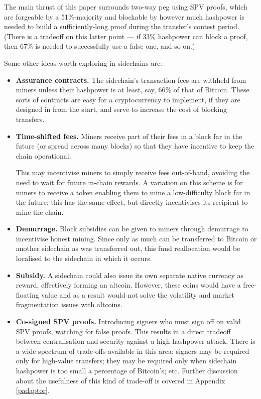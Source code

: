 \documentclass[letterpaper]{article}
\newcommand{\sidechain}{sidechain\xspace}
\newcommand{\sidechains}{sidechains\xspace}
\newcommand{\altcoin}{altcoin\xspace}
\newcommand{\altcoins}{altcoins\xspace}
\newcommand{\twowp}{two-way peg\xspace}
\begin{document}
The main thrust of this paper surrounds \twowp using SPV proofs, which are
forgeable by a 51\%-majority and blockable by however much hashpower is needed
to build a sufficiently-long proof during the transfer's contest period. (There is a tradeoff
on this latter point --- if 33\% hashpower can block a proof, then
67\% is needed to successfully use a false one, and so on.)

Some other ideas worth exploring in \sidechains are:
\begin{itemize}
\item \textbf{Assurance contracts.} The sidechain's transaction fees are withheld
from miners unless their hashpower is at least, say, 66\% of that of Bitcoin.
These sorts of contracts are easy for a cryptocurrency to implement, if they are
designed in from the start, and serve to increase the cost of blocking transfers.

\item \textbf{Time-shifted fees.} Miners receive part of their fees in a block
far in the future (or spread across many blocks) so that they have incentive to
keep the chain operational.

This may incentivise miners to simply receive fees out-of-band, avoiding the need
to wait for future in-chain rewards. A variation on this scheme is for miners to receive
a token enabling them to mine a low-difficulty block far in the future; this has the same
effect, but directly incentivises its recipient to mine the chain.

\item \textbf{Demurrage.} Block subsidies can be given to miners through
demurrage to incentivise honest mining. Since only as
much can be transferred to Bitcoin or another \sidechain as was transferred out,
this fund reallocation would be localised to the \sidechain in which it occurs.

\item \textbf{Subsidy.} A sidechain could also issue its own separate native currency as reward,
effectively forming an \altcoin. However, these coins would have a free-floating value and as a
result would not solve the volatility and market fragmentation issues with \altcoins.

\item \textbf{Co-signed SPV proofs.} Introducing signers who must sign
off on valid SPV proofs, watching for false proofs. This results in a  direct tradeoff between centralisation and security against a high-hashpower attack. There is a wide spectrum of trade-offs available in this area: signers may be required only for high-value transfers;
they may be required only when \sidechain hashpower is too small a percentage of Bitcoin's; etc. Further discussion about the usefulness of this kind of trade-off is covered in Appendix \ref{padaptor}.


\end{itemize}
\end{document}
